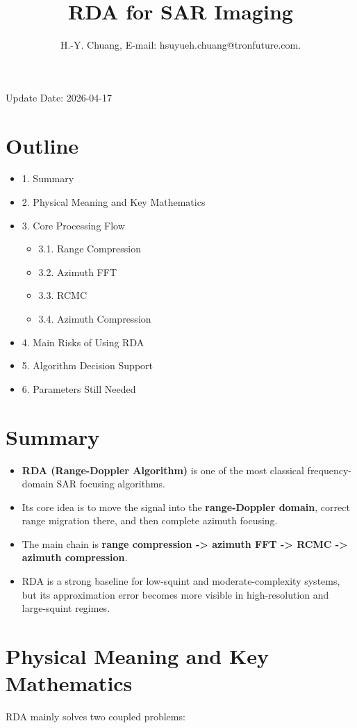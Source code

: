 \documentclass[journal,onecolumn]{IEEEtran}
\begin{document}
\title{RDA for SAR Imaging}
\author{H.-Y. Chuang, E-mail: hsuyueh.chuang@tronfuture.com.}
\maketitle
{}

Update Date: 2026-04-17

\section*{Outline}
\begin{itemize}
  \item 1. Summary
  \item 2. Physical Meaning and Key Mathematics
  \item 3. Core Processing Flow
  \begin{itemize}
    \item 3.1. Range Compression
    \item 3.2. Azimuth FFT
    \item 3.3. RCMC
    \item 3.4. Azimuth Compression
  \end{itemize}
  \item 4. Main Risks of Using RDA
  \item 5. Algorithm Decision Support
  \item 6. Parameters Still Needed
\end{itemize}
\section{Summary}
\begin{itemize}
  \item \textbf{RDA (Range-Doppler Algorithm)} is one of the most classical frequency-domain SAR focusing algorithms.
  \item Its core idea is to move the signal into the \textbf{range-Doppler domain}, correct range migration there, and then complete azimuth focusing.
  \item The main chain is \textbf{range compression -> azimuth FFT -> RCMC -> azimuth compression}.
  \item RDA is a strong baseline for low-squint and moderate-complexity systems, but its approximation error becomes more visible in high-resolution and large-squint regimes.
\end{itemize}
\section{Physical Meaning and Key Mathematics}
RDA mainly solves two coupled problems:
\end{document}
